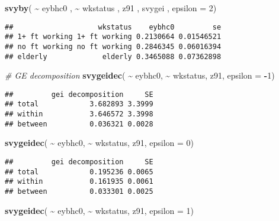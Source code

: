 \documentclass[
]{book}
\newenvironment{Shaded}{\begin{snugshade}}{\end{snugshade}}
\newcommand{\AttributeTok}[1]{\textcolor[rgb]{0.13,0.29,0.53}{#1}}
\newcommand{\CommentTok}[1]{\textcolor[rgb]{0.56,0.35,0.01}{\textit{#1}}}
\newcommand{\DecValTok}[1]{\textcolor[rgb]{0.00,0.00,0.81}{#1}}
\newcommand{\FunctionTok}[1]{\textcolor[rgb]{0.13,0.29,0.53}{\textbf{#1}}}
\newcommand{\NormalTok}[1]{#1}
\newcommand{\SpecialCharTok}[1]{\textcolor[rgb]{0.81,0.36,0.00}{\textbf{#1}}}
\begin{document}
\begin{Shaded}
\begin{Highlighting}[]
\FunctionTok{svyby}\NormalTok{( }\SpecialCharTok{\textasciitilde{}}\NormalTok{ eybhc0 , }\SpecialCharTok{\textasciitilde{}}\NormalTok{ wkstatus , z91 , svygei , }\AttributeTok{epsilon =} \DecValTok{2}\NormalTok{)}
\end{Highlighting}
\end{Shaded}

\begin{verbatim}
##                    wkstatus    eybhc0         se
## 1+ ft working 1+ ft working 0.2130664 0.01546521
## no ft working no ft working 0.2846345 0.06016394
## elderly             elderly 0.3465088 0.07362898
\end{verbatim}

\begin{Shaded}
\begin{Highlighting}[]
\CommentTok{\# GE decomposition}
\FunctionTok{svygeidec}\NormalTok{( }\SpecialCharTok{\textasciitilde{}}\NormalTok{ eybhc0, }\SpecialCharTok{\textasciitilde{}}\NormalTok{ wkstatus, z91, }\AttributeTok{epsilon =} \SpecialCharTok{{-}}\DecValTok{1}\NormalTok{)}
\end{Highlighting}
\end{Shaded}

\begin{verbatim}
##         gei decomposition     SE
## total            3.682893 3.3999
## within           3.646572 3.3998
## between          0.036321 0.0028
\end{verbatim}

\begin{Shaded}
\begin{Highlighting}[]
\FunctionTok{svygeidec}\NormalTok{( }\SpecialCharTok{\textasciitilde{}}\NormalTok{ eybhc0, }\SpecialCharTok{\textasciitilde{}}\NormalTok{ wkstatus, z91, }\AttributeTok{epsilon =} \DecValTok{0}\NormalTok{)}
\end{Highlighting}
\end{Shaded}

\begin{verbatim}
##         gei decomposition     SE
## total            0.195236 0.0065
## within           0.161935 0.0061
## between          0.033301 0.0025
\end{verbatim}

\begin{Shaded}
\begin{Highlighting}[]
\FunctionTok{svygeidec}\NormalTok{( }\SpecialCharTok{\textasciitilde{}}\NormalTok{ eybhc0, }\SpecialCharTok{\textasciitilde{}}\NormalTok{ wkstatus, z91, }\AttributeTok{epsilon =} \DecValTok{1}\NormalTok{)}
\end{Highlighting}
\end{Shaded}
\end{document}
